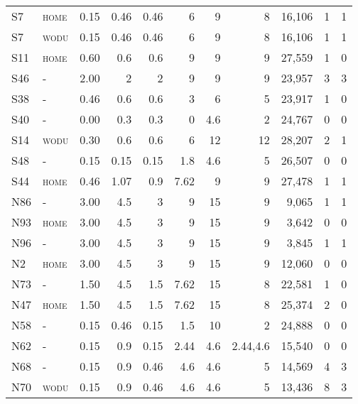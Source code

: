{\begin{landscape}
\begin{Spacing}{1}
\begin{longtable}[c]{@{}llrrrrrrrrr}
S7 & \textsc{home} & 0.15 & 0.46 & 0.46 & 6 & 9 & 8 & 16,106 & 1 & 1 \tabularnewline
S7 & \textsc{wodu} & 0.15 & 0.46 & 0.46 & 6 & 9 & 8 & 16,106 & 1 & 1 \tabularnewline
S11 & \textsc{home} & 0.60 & 0.6 & 0.6 & 9 & 9 & 9 & 27,559 & 1 & 0 \tabularnewline
S46 & - & 2.00 & 2 & 2 & 9 & 9 & 9 & 23,957 & 3 & 3 \tabularnewline
S38 & - & 0.46 & 0.6 & 0.6 & 3 & 6 & 5 & 23,917 & 1 & 0 \tabularnewline
S40 & - & 0.00 & 0.3 & 0.3 & 0 & 4.6 & 2 & 24,767 & 0 & 0 \tabularnewline
S14 & \textsc{wodu} & 0.30 & 0.6 & 0.6 & 6 & 12 & 12 & 28,207 & 2 & 1 \tabularnewline
S48 & - & 0.15 & 0.15 & 0.15 & 1.8 & 4.6 & 5 & 26,507 & 0 & 0 \tabularnewline
S44 & \textsc{home} & 0.46 & 1.07 & 0.9 & 7.62 & 9 & 9 & 27,478 & 1 & 1 \tabularnewline
N86 & - & 3.00 & 4.5 & 3 & 9 & 15 & 9 & 9,065 & 1 & 1 \tabularnewline
N93 & \textsc{home} & 3.00 & 4.5 & 3 & 9 & 15 & 9 & 3,642 & 0 & 0 \tabularnewline
N96 & - & 3.00 & 4.5 & 3 & 9 & 15 & 9 & 3,845 & 1 & 1 \tabularnewline
N2 & \textsc{home} & 3.00 & 4.5 & 3 & 9 & 15 & 9 & 12,060 & 0 & 0 \tabularnewline
N73 & - & 1.50 & 4.5 & 1.5 & 7.62 & 15 & 8 & 22,581 & 1 & 0 \tabularnewline
N47 & \textsc{home} & 1.50 & 4.5 & 1.5 & 7.62 & 15 & 8 & 25,374 & 2 & 0 \tabularnewline
N58 & - & 0.15 & 0.46 & 0.15 & 1.5 & 10 & 2 & 24,888 & 0 & 0 \tabularnewline
N62 & - & 0.15 & 0.9 & 0.15 & 2.44 & 4.6 &  2.44,4.6  & 15,540 & 0 & 0 \tabularnewline
N68 & - & 0.15 & 0.9 & 0.46 & 4.6 & 4.6 & 5 & 14,569 & 4 & 3 \tabularnewline
N70 & \textsc{wodu} & 0.15 & 0.9 & 0.46 & 4.6 & 4.6 & 5 & 13,436 & 8 & 3 \tabularnewline
\bottomrule
\end{longtable}
\end{Spacing}
\end{landscape}
\clearpage
}